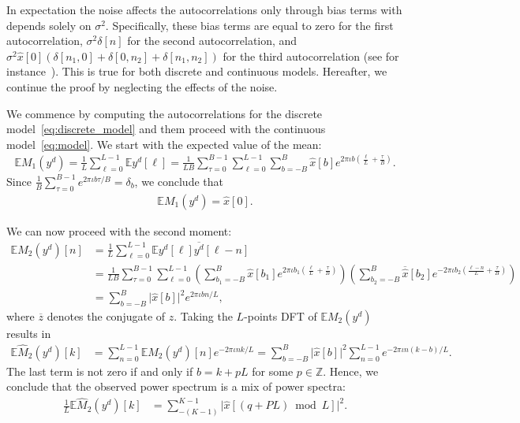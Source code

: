 \documentclass[english,12pt]{article}
\newcommand{\I}{\iota}
\newcommand{\tB}{B}
\newcommand{\hx}{\hat{x}}
\newcommand{\E}{\mathbb{E}}
\numberwithin{equation}{section}
\numberwithin{thm}{section} %
\begin{document}
In expectation the noise affects the autocorrelations only through bias terms with depends solely on $\sigma^2$. Specifically, these bias terms are equal to zero for the first autocorrelation, $\sigma^2\delta[n]$ for the second autocorrelation, and 
$\sigma^2\hat{x}[0](\delta[n_1,0]+\delta[0,n_2]+\delta[n_1,n_2])$ for the third autocorrelation (see for instance~\cite{bendory2017bispectrum}). This is true for both discrete and continuous models. Hereafter, we continue the proof by neglecting the effects of the noise.

We commence by computing the autocorrelations for the discrete model~\eqref{eq:discrete_model} and them proceed with the continuous model~\eqref{eq:model}.
We start with the expected value of the mean:
\begin{equation}
\begin{split}
\E M_1(y^d) =  \frac{1}{L} \sum_{\ell=0}^{L-1}\E y^d[\ell] =  \frac{1}{LB}\sum_{\tau=0}^{B-1}\sum_{\ell=0}^{L-1}
\sum_{b=-\tB}^{\tB}\hat{x}[b]e^{2\pi\I b \left(\frac{\ell}{L} + \frac{\tau}{B}\right) }.
\end{split}
\end{equation}
Since $\frac{1}{B}\sum_{\tau=0}^{B-1}e^{2\pi\I b \tau/B}=\delta_b$, we conclude that 
\begin{equation} \label{eq:mean}
\begin{split}
\E M_1(y^d) = \hx[0].
\end{split}
\end{equation}

We can now proceed with the second moment:
\begin{equation} \label{eq:ps}
\begin{split}
\E M_2(y^d)[n] &= \frac{1}{L}\sum_{\ell=0}^{L-1} \E y^d[\ell]\overline{y^d}[\ell-n] \\ &=  \frac{1}{LB}\sum_{\tau=0}^{B-1}\sum_{\ell=0}^{L-1}
\left(\sum_{b_1=-\tB}^{\tB}\hat{x}[b_1]e^{2\pi\I b_1 \left(\frac{\ell}{L} + \frac{\tau}{B}\right)} \right)
\left(\sum_{b_2=-\tB}^{\tB}\overline{\hx}[b_2]e^{-2\pi\I b_2 \left(\frac{\ell-n}{L} + \frac{\tau}{B}\right)} \right) \\
&=
\sum_{b=-\tB}^{\tB}\vert \hat{x}[b]\vert ^2e^{2\pi\I bn/L},
\end{split}
\end{equation}
where $\overline{z}$ denotes the conjugate of $z$.
Taking the $L$-points DFT of $\E M_2(y^d)$ results in
\begin{equation}
\begin{split}
\E \hat{M}_2(y^d)[k] &= \sum_{n=0}^{L-1}\E M_2(y^d)[n]e^{-2\pi\I nk/L} = \sum_{b=-\tB}^{\tB}\vert \hat{x}[b]\vert^2\sum_{n=0}^{L-1}e^{-2\pi\I n(k-b)/L}.
\end{split}
\end{equation}
The last term is not zero if and only if $b = k + pL$ for some $p\in\mathbb{Z}$.  Hence, we conclude that the observed power spectrum is a mix of power spectra:
\begin{equation}
\begin{split}
\frac{1}{L}\E \hat{M}_2(y^d)[k] &=  \sum_{-(K-1)}^{K-1} \vert \hat{x}[(q+PL)\bmod L]\vert^2.
\end{split}
\end{equation}
\end{document}

